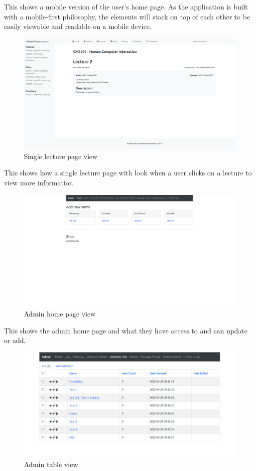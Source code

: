 This shows a mobile version of the user's home page. As the application is built with a mobile-first philosophy, the elements will stack on top of each other to be easily viewable and readable on a mobile device.

\begin{figure}[H]
\centering
\includegraphics[scale=0.20]{images/application/45 - lecture_single.png}
\caption{Single lecture page view}
\label{fig:figure2}
\end{figure}

This shows how a single lecture page with look when a user clicks on a lecture to view more information.

\begin{figure}[H]
\centering
\includegraphics[scale=0.20]{images/application/48 - admin_home.png}
\caption{Admin home page view}
\label{fig:figure2}
\end{figure}

This shows the admin home page and what they have access to and can update or add.

\begin{figure}[H]
\centering
\includegraphics[scale=0.35]{images/application/49 - admin_table_example.png}
\caption{Admin table view}
\label{fig:figure2}
\end{figure}

